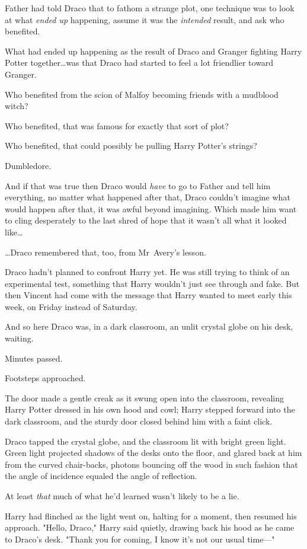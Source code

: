 Father had told Draco that to fathom a strange plot, one technique was to look
at what \emph{ended up} happening, assume it was the \emph{intended} result,
and ask who benefited.

What had ended up happening as the result of Draco and Granger fighting Harry
Potter together…was that Draco had started to feel a lot friendlier
toward Granger.

Who benefited from the scion of Malfoy becoming friends with a mudblood witch?

Who benefited, that was famous for exactly that sort of plot?

Who benefited, that could possibly be pulling Harry Potter’s strings?

Dumbledore.

And if that was true then Draco would \emph{have} to go to Father and tell him
everything, no matter what happened after that, Draco couldn’t imagine what
would happen after that, it was awful beyond imagining. Which made him want to
cling desperately to the last shred of hope that it wasn’t all what it looked
like…

…Draco remembered that, too, from Mr~Avery’s lesson.

Draco hadn’t planned to confront Harry yet. He was still trying to think of an
experimental test, something that Harry wouldn’t just see through and fake. But
then Vincent had come with the message that Harry wanted to meet early this
week, on Friday instead of Saturday.

And so here Draco was, in a dark classroom, an unlit crystal globe on his desk,
waiting.

Minutes passed.

Footsteps approached.

The door made a gentle creak as it swung open into the classroom, revealing
Harry Potter dressed in his own hood and cowl; Harry stepped forward into the
dark classroom, and the sturdy door closed behind him with a faint click.

Draco tapped the crystal globe, and the classroom lit with bright green light.
Green light projected shadows of the desks onto the floor, and glared back at
him from the curved chair-backs, photons bouncing off the wood in such fashion
that the angle of incidence equaled the angle of reflection.

At least \emph{that} much of what he’d learned wasn’t likely to be a lie.

Harry had flinched as the light went on, halting for a moment, then resumed his
approach. "Hello, Draco," Harry said quietly, drawing back his hood as he came
to Draco’s desk. "Thank you for coming, I know it’s not our usual time—"

